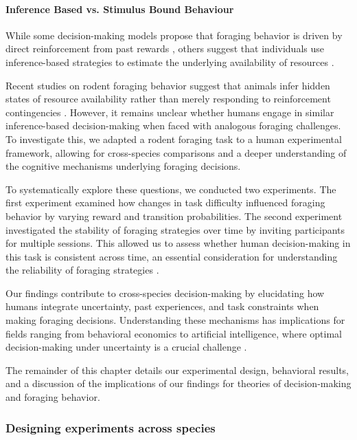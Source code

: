 \documentclass[11pt]{article}
\begin{document}
\paragraph{Inference Based vs. Stimulus Bound Behaviour}

While some decision-making models propose that foraging behavior is driven by direct reinforcement from past rewards , others suggest that individuals use inference-based strategies to estimate the underlying availability of resources \cite{behrens2007learning}.

Recent studies on rodent foraging behavior suggest that animals infer hidden states of resource availability rather than merely responding to reinforcement contingencies \cite{vertechi2020inference}. However, it remains unclear whether humans engage in similar inference-based decision-making when faced with analogous foraging challenges. To investigate this, we adapted a rodent foraging task to a human experimental framework, allowing for cross-species comparisons and a deeper understanding of the cognitive mechanisms underlying foraging decisions.

To systematically explore these questions, we conducted two experiments. The first experiment examined how changes in task difficulty influenced foraging behavior by varying reward and transition probabilities. The second experiment investigated the stability of foraging strategies over time by inviting participants for multiple sessions. This allowed us to assess whether human decision-making in this task is consistent across time, an essential consideration for understanding the reliability of foraging strategies \cite{daw2006cortical}.

Our findings contribute to cross-species decision-making by elucidating how humans integrate uncertainty, past experiences, and task constraints when making foraging decisions. Understanding these mechanisms has implications for fields ranging from behavioral economics to artificial intelligence, where optimal decision-making under uncertainty is a crucial challenge \cite{gershman2018deconstructing, sutton1998reinforcement}.

The remainder of this chapter details our experimental design, behavioral results, and a discussion of the implications of our findings for theories of decision-making and foraging behavior.

\subsubsection{Designing experiments across species}
\end{document}
